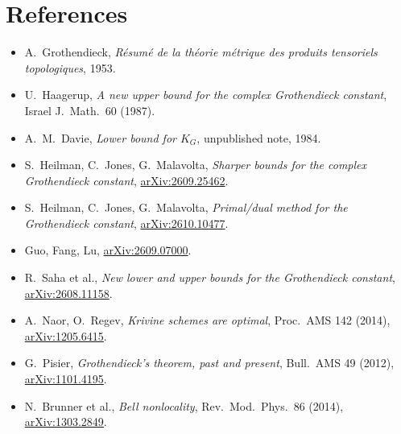 \documentclass[11pt,a4paper]{article}
\begin{document}
\clearpage
\section*{References}
\small\sloppy
\begin{itemize}
\item A.~Grothendieck, \emph{R\'esum\'e de la th\'eorie m\'etrique des produits tensoriels topologiques}, 1953.
\item U.~Haagerup, \emph{A new upper bound for the complex Grothendieck constant}, Israel J.\ Math.\ 60 (1987).
\item A.~M.~Davie, \emph{Lower bound for $K_G$}, unpublished note, 1984.
\item S.~Heilman, C.~Jones, G.~Malavolta, \emph{Sharper bounds for the complex Grothendieck constant},
 \href{https://arxiv.org/abs/2609.25462}{arXiv:2609.25462}.
\item S.~Heilman, C.~Jones, G.~Malavolta, \emph{Primal/dual method for the Grothendieck constant},
 \href{https://arxiv.org/abs/2610.10477}{arXiv:2610.10477}.
\item Guo, Fang, Lu, \href{https://arxiv.org/abs/2609.07000}{arXiv:2609.07000}.
\item R.~Saha et al., \emph{New lower and upper bounds for the Grothendieck constant},
 \href{https://arxiv.org/abs/2608.11158}{arXiv:2608.11158}.
\item A.~Naor, O.~Regev, \emph{Krivine schemes are optimal}, Proc.\ AMS 142 (2014),
 \href{https://arxiv.org/abs/1205.6415}{arXiv:1205.6415}.
\item G.~Pisier, \emph{Grothendieck's theorem, past and present}, Bull.\ AMS 49 (2012),
 \href{https://arxiv.org/abs/1101.4195}{arXiv:1101.4195}.
\item N.~Brunner et al., \emph{Bell nonlocality}, Rev.\ Mod.\ Phys.\ 86 (2014),
 \href{https://arxiv.org/abs/1303.2849}{arXiv:1303.2849}.
\end{itemize}
\end{document}
